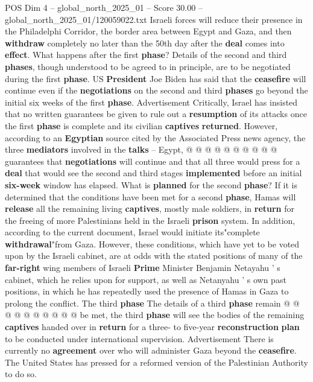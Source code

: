 \begin{textsample}{POS Dim 4 – global\_north\_2025\_01 – Score 30.00 – global\_north\_2025\_01/120059022.txt}
Israeli forces will reduce their presence in the Philadelphi Corridor, the border area between Egypt and Gaza, and then \textbf{withdraw} completely no later than the 50th day after the \textbf{deal} comes into \textbf{effect}.
What happens after the first \textbf{phase}?
Details of the second and third \textbf{phases}, though understood to be agreed to in principle, are to be negotiated during the first \textbf{phase}.
US \textbf{President} Joe Biden has said that the \textbf{ceasefire} will continue even if the \textbf{negotiations} on the second and third \textbf{phases} go beyond the initial six weeks of the first \textbf{phase}.
Advertisement Critically, Israel has insisted that no written guarantees be given to rule out a \textbf{resumption} of its attacks once the first \textbf{phase} is complete and its civilian \textbf{captives} \textbf{returned}.
However, according to an \textbf{Egyptian} source cited by the Associated Press news agency, the three \textbf{mediators} involved in the \textbf{talks} -- Egypt, @ @ @ @ @ @ @ @ @ @ guarantees that \textbf{negotiations} will continue and that all three would press for a \textbf{deal} that would see the second and third stages \textbf{implemented} before an initial \textbf{six-week} window has elapsed.
What is \textbf{planned} for the second \textbf{phase}?
If it is determined that the conditions have been met for a second \textbf{phase}, Hamas will \textbf{release} all the remaining living \textbf{captives}, mostly male soldiers, in \textbf{return} for the freeing of more Palestinians held in the Israeli \textbf{prison} system.
In addition, according to the current document, Israel would initiate its"complete \textbf{withdrawal}"from Gaza.
However, these conditions, which have yet to be voted upon by the Israeli cabinet, are at odds with the stated positions of many of the \textbf{far-right} wing members of Israeli \textbf{Prime} Minister Benjamin Netayahu ' s cabinet, which he relies upon for support, as well as Netanyahu ' s own past positions, in which he has repeatedly used the presence of Hamas in Gaza to prolong the conflict.
The third \textbf{phase} The details of a third \textbf{phase} remain @ @ @ @ @ @ @ @ @ @ be met, the third \textbf{phase} will see the bodies of the remaining \textbf{captives} handed over in \textbf{return} for a three- to five-year \textbf{reconstruction} \textbf{plan} to be conducted under international supervision.
Advertisement There is currently no \textbf{agreement} over who will administer Gaza beyond the \textbf{ceasefire}.
The United States has pressed for a reformed version of the Palestinian Authority to do so.

\end{textsample}
